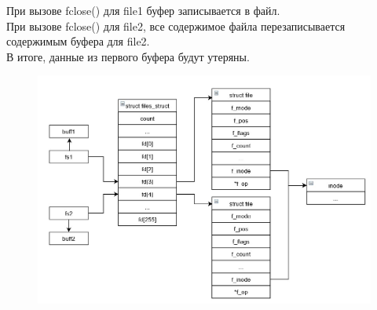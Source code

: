 \documentclass[14pt, a4paper]{extarticle}
\begin{document}
При вызове fclose() для file1 буфер записывается в файл.\\
При вызове fclose() для file2, все содержимое файла перезаписывается содержимым буфера для file2.\\ 
В итоге, данные из первого буфера будут утеряны.
\begin{figure}[h!]
	\includegraphics[scale=0.60]{source/diag3.jpg}
\end{figure}
\newpage
\end{document}
